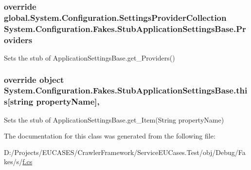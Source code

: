 \hypertarget{class_system_1_1_configuration_1_1_fakes_1_1_stub_application_settings_base_a70d9c03d530a398be5187d2505f60ad2}{
\subsubsection[{Providers}]{\setlength{\rightskip}{0pt plus 5cm}override global.\-System.\-Configuration.\-Settings\-Provider\-Collection System.\-Configuration.\-Fakes.\-Stub\-Application\-Settings\-Base.\-Providers\hspace{0.3cm}{\ttfamily [get]}}}\label{class_system_1_1_configuration_1_1_fakes_1_1_stub_application_settings_base_a70d9c03d530a398be5187d2505f60ad2}


Sets the stub of Application\-Settings\-Base.\-get\-\_\-\-Providers()

\hypertarget{class_system_1_1_configuration_1_1_fakes_1_1_stub_application_settings_base_ac2ec23cb4a731145d81d8bc4d166526d}{
\subsubsection[{this[string property\-Name]}]{\setlength{\rightskip}{0pt plus 5cm}override object System.\-Configuration.\-Fakes.\-Stub\-Application\-Settings\-Base.\-this\mbox{[}string property\-Name\mbox{]}\hspace{0.3cm}{\ttfamily [get]}, {\ttfamily [set]}}}\label{class_system_1_1_configuration_1_1_fakes_1_1_stub_application_settings_base_ac2ec23cb4a731145d81d8bc4d166526d}


Sets the stub of Application\-Settings\-Base.\-get\-\_\-\-Item(\-String property\-Name)



The documentation for this class was generated from the following file\-:\begin{DoxyCompactItemize}
\item 
D\-:/\-Projects/\-E\-U\-C\-A\-S\-E\-S/\-Crawler\-Framework/\-Service\-E\-U\-Cases.\-Test/obj/\-Debug/\-Fakes/s/\hyperlink{s_2f_8cs}{f.\-cs}\end{DoxyCompactItemize}
